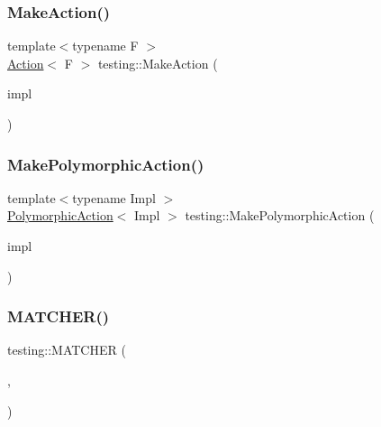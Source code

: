 \mbox{\label{namespacetesting_aa254d28c8d883899cbf11ea2f05fc195}} 
\subsubsection{\texorpdfstring{MakeAction()}{MakeAction()}}
{\footnotesize\ttfamily template$<$typename F $>$ \\
\mbox{\hyperlink{classtesting_1_1_action}{Action}}$<$ F $>$ testing\+::\+Make\+Action (\begin{DoxyParamCaption}\item[{\mbox{\hyperlink{classtesting_1_1_action_interface}{Action\+Interface}}$<$ F $>$ $\ast$}]{impl }\end{DoxyParamCaption})}

\mbox{\label{namespacetesting_a45df529b8166936d970884383f0ede82}} 
\subsubsection{\texorpdfstring{MakePolymorphicAction()}{MakePolymorphicAction()}}
{\footnotesize\ttfamily template$<$typename Impl $>$ \\
\mbox{\hyperlink{classtesting_1_1_polymorphic_action}{Polymorphic\+Action}}$<$ Impl $>$ testing\+::\+Make\+Polymorphic\+Action (\begin{DoxyParamCaption}\item[{const Impl \&}]{impl }\end{DoxyParamCaption})\hspace{0.3cm}{\ttfamily [inline]}}

\mbox{\label{namespacetesting_a4fcb3f407119590471bea5a90a8d2dda}} 
\subsubsection{\texorpdfstring{MATCHER()}{MATCHER()}\hspace{0.1cm}{\footnotesize\ttfamily [1/3]}}
{\footnotesize\ttfamily testing\+::\+M\+A\+T\+C\+H\+ER (\begin{DoxyParamCaption}\item[{Is\+Empty}]{,  }\item[{negation ? \char`\"{}isn\textquotesingle{}\mbox{\hyperlink{_mutual_8h_a978d88b393c8a37dc2614c88788b3442}{t}} empty\char`\"{} \+:\char`\"{}is empty\char`\"{}}]{ }\end{DoxyParamCaption})}

